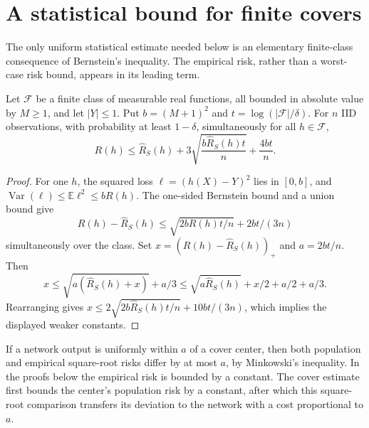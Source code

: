 \section{A statistical bound for finite covers}
\label{ag-sec:finite-cover-statistics}

The only uniform statistical estimate needed below is an elementary
finite-class consequence of Bernstein's inequality. The empirical
risk, rather than a worst-case risk bound, appears in its leading term.

\begin{lemma}
\label{ag-lem:finite-cover-bernstein}
Let $\mathcal F$ be a finite class of measurable real functions, all
bounded in absolute value by $M\geq1$, and let $|Y|\leq1$.
Put $b=(M+1)^2$ and $t=\log(|\mathcal F|/\delta)$.
For $n$ IID observations, with probability at least $1-\delta$,
simultaneously for all $h\in\mathcal F$,
\begin{equation}
 R(h)\leq\widehat R_S(h)
       +3\sqrt{\frac{b\widehat R_S(h)t}{n}}
       +\frac{4bt}{n}.
 \label{ag-eq:finite-cover-bernstein}
\end{equation}
\end{lemma}
\begin{proof}
For one $h$, the squared loss $\ell=(h(X)-Y)^2$ lies in $[0,b]$,
and $\operatorname{Var}(\ell)\leq\mathbb E\ell^2\leq bR(h)$.
The one-sided Bernstein bound and a union bound give
\[
 R(h)-\widehat R_S(h)
 \leq\sqrt{2bR(h)t/n}+2bt/(3n)
\]
simultaneously over the class. Set
$x=(R(h)-\widehat R_S(h))_+$ and $a=2bt/n$.
Then
\[
 x\leq\sqrt{a(\widehat R_S(h)+x)}+a/3
 \leq\sqrt{a\widehat R_S(h)}+x/2+a/2+a/3.
\]
Rearranging gives
$x\leq2\sqrt{2b\widehat R_S(h)t/n}+10bt/(3n)$,
which implies the displayed weaker constants.
\end{proof}

If a network output is uniformly within $a$ of a cover center, then
both population and empirical square-root risks differ by at most $a$,
by Minkowski's inequality. In the proofs below the empirical risk is
bounded by a constant. The cover estimate first bounds the center's
population risk by a constant, after which this square-root comparison
transfers its deviation to the network with a cost proportional to $a$.
